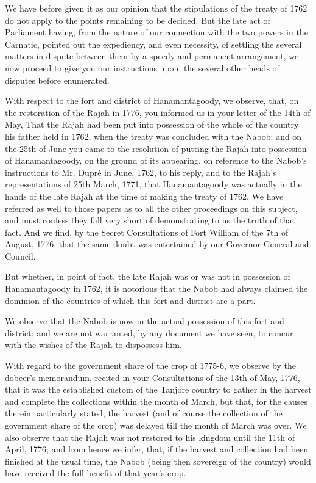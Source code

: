 We have before given it as our opinion that the stipulations of the treaty of 1762 do not apply to the points remaining to be decided. But the late act of Parliament having, from the nature of our connection with the two powers in the Carnatic, pointed out the expediency, and even necessity, of settling the several matters in dispute between them by a speedy and permanent arrangement, we now proceed to give you our instructions upon, the several other heads of disputes before enumerated.

With respect to the fort and district of Hanamantagoody, we observe, that, on the restoration of the Rajah in 1776, you informed us in your letter of the 14th of May, That the Rajah had been put into possession of the whole of the country his father held in 1762, when the treaty was concluded with the Nabob; and on the 25th of June you came to the resolution of putting the Rajah into possession of Hanamantagoody, on the ground of its appearing, on reference to the Nabob's instructions to Mr. Dupré in June, 1762, to his reply, and to the Rajah's representations of 25th March, 1771, that Hanamantagoody was actually in the hands of the late Rajah at the time of making the treaty of 1762. We have referred as well to those papers as to all the other proceedings on this subject, and must confess they fall very short of demonstrating to us the truth of that fact. And we find, by the Secret Consultations of Fort William of the 7th of August, 1776, that the same doubt was entertained by our Governor-General and Council.

But whether, in point of fact, the late Rajah was or was not in possession of Hanamantagoody in 1762, it is notorious that the Nabob had always claimed the dominion of the countries of which this fort and district are a part.

We observe that the Nabob is now in the actual possession of this fort and district; and we are not warranted, by any document we have seen, to concur with the wishes of the Rajah to dispossess him.

With regard to the government share of the crop of 1775-6, we observe by the dobeer's memorandum, recited in your Consultations of the 13th of May, 1776, that it was the established custom of the Tanjore country to gather in the harvest and complete the collections within the month of March, but that, for the causes therein particularly stated, the harvest (and of course the collection of the government share of the crop) was delayed till the month of March was over. We also observe that the Rajah was not restored to his kingdom until the 11th of April, 1776; and from hence we infer, that, if the harvest and collection had been finished at the usual time, the Nabob (being then sovereign of the country) would have received the full benefit of that year's crop.

